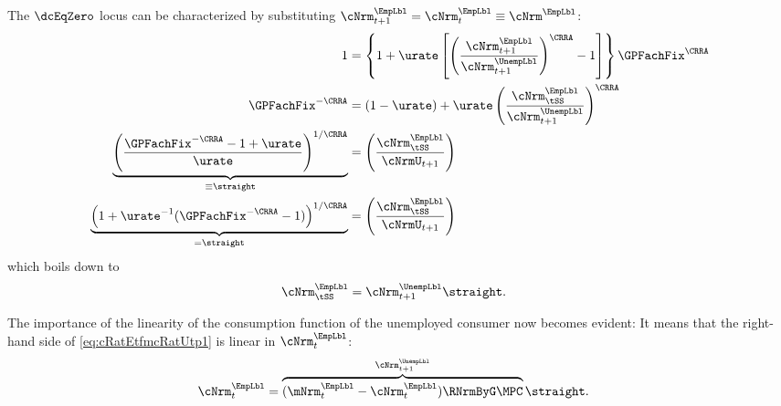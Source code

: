 \documentclass{econark}
\begin{document}
The $\dcEqZero$ locus can be characterized by substituting ${\cNrm}^{\EmpLbl}_{t+1}={\cNrm}^{\EmpLbl}_{t} \equiv {\cNrm}^{\EmpLbl}$:
\begin{equation}\begin{gathered}\begin{aligned}
         1 & = \left\{1+\urate\left[\left(\frac{{\cNrm}^{\EmpLbl}_{t+1}}{\cNrm_{t+1}^{\UnempLbl}}\right)^{\CRRA}-1\right]\right\} \GPFachFix^{\CRRA}
\\ \GPFachFix^{-\CRRA} & =  (1-\urate)+\urate\left(\frac{{\cNrm}^{\EmpLbl}_{\tSS}}{\cNrm_{t+1}^{\UnempLbl} }\right)^{\CRRA}
\\ \underbrace{\left(\frac{\GPFachFix^{-\CRRA}-1+\urate}{\urate}\right)^{1/\CRRA}}_{\equiv \straight} & =   \left(\frac{{\cNrm}^{\EmpLbl}_{\tSS}}{\cNrmU_{t+1}}\right) \label{eq:straightDef}
  \\ \underbrace{\left(1+\urate^{-1}(\GPFachFix^{-\CRRA}-1)\right)^{1/\CRRA}}_{=\straight} & =   \left(\frac{{\cNrm}^{\EmpLbl}_{\tSS}}{\cNrmU_{t+1}}\right)
\end{aligned}\end{gathered}\end{equation}
which boils down to 
\begin{equation}\begin{gathered}\begin{aligned}
     {\cNrm}^{\EmpLbl}_{\tSS} & = \cNrm^{\UnempLbl}_{t+1} \straight \label{eq:cRatEtfmcRatUtp1}.
\end{aligned}\end{gathered}\end{equation}


The importance of the linearity of the consumption function of the unemployed consumer now becomes evident:  It means that the right-hand side of \eqref{eq:cRatEtfmcRatUtp1} is linear in $\cNrm^{\EmpLbl}_{t}$:
\begin{equation}\begin{gathered}\begin{aligned}
  \cNrm^{\EmpLbl}_{t} & =  \overbrace{(\mNrm^{\EmpLbl}_{t}-{\cNrm}^{\EmpLbl}_{t})\RNrmByG \MPC}^{\cNrm^{\UnempLbl}_{t+1}} \straight \label{eq:PSTerm}.
\end{aligned}\end{gathered}\end{equation}
\end{document}
